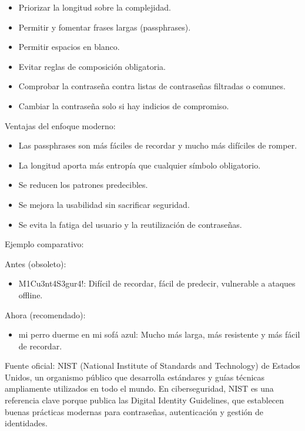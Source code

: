 \documentclass[
  spanish,
  a4paper,
  openany]{book}
\providecommand{\tightlist}{%
  \setlength{\itemsep}{0pt}\setlength{\parskip}{0pt}}
\begin{document}
\begin{itemize}
\item
  Priorizar la longitud sobre la complejidad.
\item
  Permitir y fomentar frases largas (passphrases).
\item
  Permitir espacios en blanco.
\item
  Evitar reglas de composición obligatoria.
\item
  Comprobar la contraseña contra listas de contraseñas filtradas o comunes.
\item
  Cambiar la contraseña solo si hay indicios de compromiso.
\end{itemize}

Ventajas del enfoque moderno:

\begin{itemize}
\item
  Las passphrases son más fáciles de recordar y mucho más difíciles de romper.
\item
  La longitud aporta más entropía que cualquier símbolo obligatorio.
\item
  Se reducen los patrones predecibles.
\item
  Se mejora la usabilidad sin sacrificar seguridad.
\item
  Se evita la fatiga del usuario y la reutilización de contraseñas.
\end{itemize}

Ejemplo comparativo:

Antes (obsoleto):

\begin{itemize}
\tightlist
\item
  M1Cu3nt4S3gur4!: Difícil de recordar, fácil de predecir, vulnerable a ataques offline.
\end{itemize}

Ahora (recomendado):

\begin{itemize}
\tightlist
\item
  mi perro duerme en mi sofá azul: Mucho más larga, más resistente y más fácil de recordar.
\end{itemize}

Fuente oficial: NIST (National Institute of Standards and Technology) de Estados Unidos, un organismo público que desarrolla estándares y guías técnicas ampliamente utilizados en todo el mundo. En ciberseguridad, NIST es una referencia clave porque publica las Digital Identity Guidelines, que establecen buenas prácticas modernas para contraseñas, autenticación y gestión de identidades. \citep{NIST}
\end{document}
